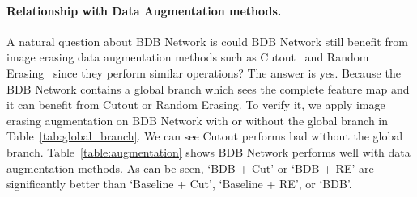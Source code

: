 \documentclass[10pt,twocolumn,letterpaper]{article}
\begin{document}
\paragraph{Relationship with Data Augmentation methods.}\vspace{-4mm}
A natural question about BDB Network is could BDB Network still benefit from image erasing data augmentation methods such as Cutout~\cite{devries2017improved} and Random Erasing~\cite{zhong2017random} since they perform similar operations? The answer is yes. Because the BDB Network contains a global branch which sees the complete feature map and it can benefit from Cutout or Random Erasing. To verify it, we apply image erasing augmentation on BDB Network with or without the global branch in Table~\ref{tab:global_branch}. We can see Cutout performs bad without the global branch. Table~\ref{table:augmentation} shows BDB Network performs well with data augmentation methods. As can be seen, `BDB + Cut' or `BDB + RE' are significantly better than `Baseline + Cut', `Baseline + RE', or `BDB'. 
\begin{table}
\begin{center}
    \end{center}
    \vspace{-4mm}
    \caption{The statistics of the image retrieval datastes including CARS196~\cite{krause20133d}, CUB200-2011~\cite{wah2011caltech}, Stanford online products(SOP)~\cite{oh2016deep}, and In-Shop Clothes retrieval dataset~\cite{liu2016deepfashion}. Notice that the test set of In-Shop Clothes retrieval dataset is further split to query dataset with 14,218 images and gallery dataset with 12,612 images.}
    \label{tab:retrieval_dataset}
    \vspace{2mm}
\end{table}
\end{document}
